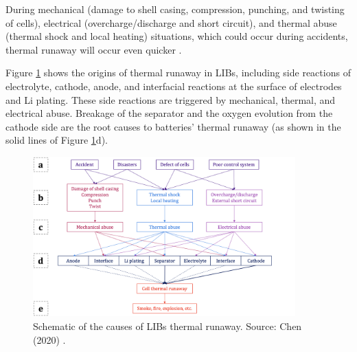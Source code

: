 During mechanical (damage to shell casing, compression, punching, and twisting of cells), electrical (overcharge/discharge and short circuit), and thermal abuse (thermal shock and local heating) situations, which could occur during accidents, thermal runaway will occur even quicker \cite{guo2010three,kim2007three,lamb2014evaluation}.
\vspace{5mm}

Figure \ref{fig:tr-graph} shows the origins of thermal runaway in LIBs, including side reactions of electrolyte, cathode, anode, and interfacial reactions at the surface of electrodes and Li plating. These side reactions are triggered by mechanical, thermal, and electrical abuse. Breakage of the separator and the oxygen evolution from the cathode side are the root causes to batteries' thermal runaway (as shown in the solid lines of Figure \ref{fig:tr-graph}d).

\begin{figure}[ht]
    \centering
    \includegraphics[width=0.9\textwidth]{Images/Chapter2/tr-graph.png}
    \caption[Schematic of the causes of lithium-ion battery thermal runaway]{Schematic of the causes of LIBs thermal runaway. Source: Chen (2020) \cite{chen2021review}.}
    \label{fig:tr-graph}
\end{figure}

